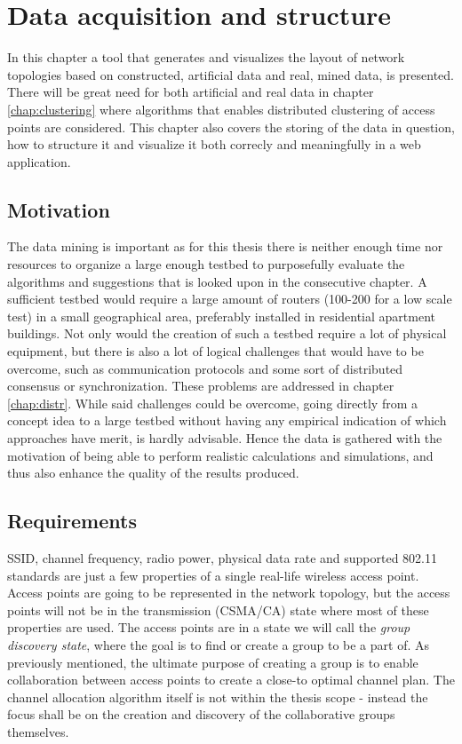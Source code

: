 \chapter{Data acquisition and structure}\label{dataacc}
In this chapter a tool that generates and visualizes the layout of network topologies based on constructed, artificial data and real, mined data, is presented. 
There will be great need for both artificial and real data in chapter \ref{chap:clustering} where algorithms that enables distributed clustering of access points are considered.
This chapter also covers the storing of the data in question, how to structure it and visualize it both correcly and meaningfully in a web application. 

\section{Motivation}
The data mining is important as for this thesis there is neither enough time nor resources to organize a large enough testbed to purposefully evaluate the
algorithms and suggestions that is looked upon in the consecutive chapter. A sufficient testbed would require a large amount of routers (100-200 for a low scale test)
in a small geographical area, preferably installed in residential apartment buildings. Not only would the creation of such a testbed require a lot of physical equipment,
but there is also a lot of logical challenges that would have to be overcome, such as communication protocols and some sort of distributed consensus or synchronization.
These problems are addressed in chapter \ref{chap:distr}. While said challenges could be overcome, going directly from a concept idea to a large testbed
without having any empirical indication of which approaches have merit, is hardly advisable. Hence the data is gathered with the motivation of being able to perform realistic
calculations and simulations, and thus also enhance the quality of the results produced. 

\section{Requirements}
SSID, channel frequency, radio power, physical data rate and supported 802.11 standards are just a few properties of a single real-life wireless access point.
Access points are going to be represented in the network topology, but the access points will not be in the transmission (CSMA/CA) state where
most of these properties are used. The access points are in a state we will call the \textit{group discovery state}, where the goal is to find or create a group to be a part of. 
As previously mentioned, the ultimate purpose of creating a group is to enable collaboration between access points to create a close-to optimal channel plan. The channel allocation algorithm
itself is not within the thesis scope - instead the focus shall be on the creation and discovery of the collaborative groups themselves.

